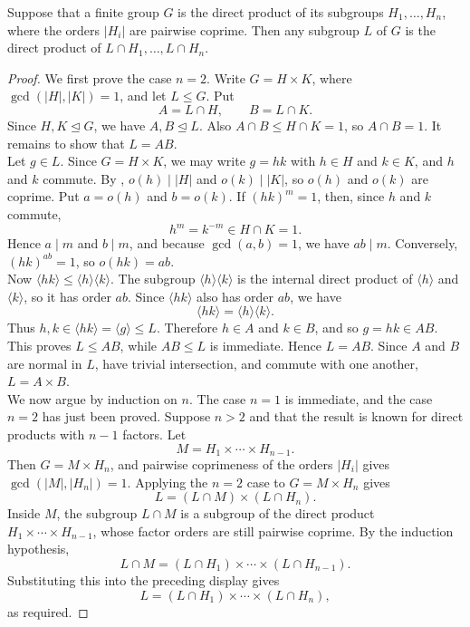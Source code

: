 \documentclass[../Odyssey_Project.tex]{subfiles}
\begin{document}
\begin{proposition}
\label{prop:2.10}
Suppose that a finite group $G$ is the direct product of its subgroups $H_1,\dots,H_n$, where the orders $|H_i|$ are pairwise coprime. Then any subgroup $L$ of $G$ is the direct product of $L \cap H_1, \dots, L \cap H_n$.
\end{proposition}
\begin{proof}
    We first prove the case $n = 2$. Write $G = H \times K$, where $\gcd(|H|,|K|) = 1$, and let $L \leq G$. Put
    \[
        A = L \cap H,
        \qquad
        B = L \cap K.
    \]
    Since $H,K \trianglelefteq G$, we have $A,B \trianglelefteq L$. Also $A \cap B \leq H \cap K = 1$, so $A \cap B = 1$. It remains to show that $L = AB$. \\
    Let $g \in L$. Since $G = H \times K$, we may write $g = hk$ with $h \in H$ and $k \in K$, and $h$ and $k$ commute. By , $o(h) \mid |H|$ and $o(k) \mid |K|$, so $o(h)$ and $o(k)$ are coprime. Put $a = o(h)$ and $b = o(k)$. If $(hk)^m = 1$, then, since $h$ and $k$ commute,
    \[
        h^m = k^{-m} \in H \cap K = 1.
    \]
    Hence $a \mid m$ and $b \mid m$, and because $\gcd(a,b) = 1$, we have $ab \mid m$. Conversely, $(hk)^{ab} = 1$, so $o(hk) = ab$. \\
    Now $\langle hk \rangle \leq \langle h \rangle\langle k \rangle$. The subgroup $\langle h \rangle\langle k \rangle$ is the internal direct product of $\langle h \rangle$ and $\langle k \rangle$, so it has order $ab$. Since $\langle hk \rangle$ also has order $ab$, we have
    \[
        \langle hk \rangle = \langle h \rangle\langle k \rangle.
    \]
    Thus $h,k \in \langle hk \rangle = \langle g \rangle \leq L$. Therefore $h \in A$ and $k \in B$, and so $g = hk \in AB$. This proves $L \leq AB$, while $AB \leq L$ is immediate. Hence $L = AB$. Since $A$ and $B$ are normal in $L$, have trivial intersection, and commute with one another, $L = A \times B$. \\
    We now argue by induction on $n$. The case $n = 1$ is immediate, and the case $n = 2$ has just been proved. Suppose $n > 2$ and that the result is known for direct products with $n-1$ factors. Let
    \[
        M = H_1 \times \cdots \times H_{n-1}.
    \]
    Then $G = M \times H_n$, and pairwise coprimeness of the orders $|H_i|$ gives $\gcd(|M|,|H_n|) = 1$. Applying the $n = 2$ case to $G = M \times H_n$ gives
    \[
        L = (L \cap M) \times (L \cap H_n).
    \]
    Inside $M$, the subgroup $L \cap M$ is a subgroup of the direct product $H_1 \times \cdots \times H_{n-1}$, whose factor orders are still pairwise coprime. By the induction hypothesis,
    \[
        L \cap M = (L \cap H_1) \times \cdots \times (L \cap H_{n-1}).
    \]
    Substituting this into the preceding display gives
    \[
        L = (L \cap H_1) \times \cdots \times (L \cap H_n),
    \]
    as required.
\end{proof}
\end{document}
